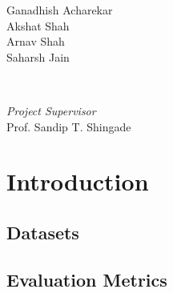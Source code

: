 \documentclass[]{article}
\begin{document}
\begin{titlepage}
	\begin{minipage}{0.4\textwidth}
		\begin{flushleft}
			\large
			Ganadhish Acharekar\\
			Akshat Shah\\
			Arnav Shah\\
			Saharsh Jain
		\end{flushleft}
	\end{minipage}
	~
	\begin{minipage}{0.4\textwidth}
		\begin{flushright}
			\large
			\textit{Project Supervisor}\\
			Prof. Sandip T. Shingade
		\end{flushright}
	\end{minipage}
	
	
	
	
	
	
	 
	
	\vfill %
	
\end{titlepage}
\newpage
\tableofcontents
\newpage

\section{Introduction}



\subsection{Datasets}

\subsection{Evaluation Metrics}

\end{document}
